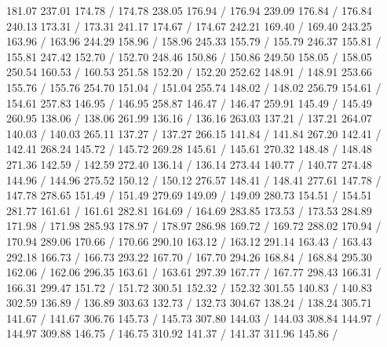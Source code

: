 { 181.07 237.01 174.78 /
 174.78 238.05 176.94 /
 176.94 239.09 176.84 /
 176.84 240.13 173.31 /
 173.31 241.17 174.67 /
 174.67 242.21 169.40 /
 169.40 243.25 163.96 /
 163.96 244.29 158.96 /
 158.96 245.33 155.79 /
 155.79 246.37 155.81 /
 155.81 247.42 152.70 /
 152.70 248.46 150.86 /
 150.86 249.50 158.05 /
 158.05 250.54 160.53 /
 160.53 251.58 152.20 /
 152.20 252.62 148.91 /
 148.91 253.66 155.76 /
 155.76 254.70 151.04 /
 151.04 255.74 148.02 /
 148.02 256.79 154.61 /
 154.61 257.83 146.95 /
 146.95 258.87 146.47 /
 146.47 259.91 145.49 /
 145.49 260.95 138.06 /
 138.06 261.99 136.16 /
 136.16 263.03 137.21 /
 137.21 264.07 140.03 /
 140.03 265.11 137.27 /
 137.27 266.15 141.84 /
 141.84 267.20 142.41 /
 142.41 268.24 145.72 /
 145.72 269.28 145.61 /
 145.61 270.32 148.48 /
 148.48 271.36 142.59 /
 142.59 272.40 136.14 /
 136.14 273.44 140.77 /
 140.77 274.48 144.96 /
 144.96 275.52 150.12 /
 150.12 276.57 148.41 /
 148.41 277.61 147.78 /
 147.78 278.65 151.49 /
 151.49 279.69 149.09 /
 149.09 280.73 154.51 /
 154.51 281.77 161.61 /
 161.61 282.81 164.69 /
 164.69 283.85 173.53 /
 173.53 284.89 171.98 /
 171.98 285.93 178.97 /
 178.97 286.98 169.72 /
 169.72 288.02 170.94 /
 170.94 289.06 170.66 /
 170.66 290.10 163.12 /
 163.12 291.14 163.43 /
 163.43 292.18 166.73 /
 166.73 293.22 167.70 /
 167.70 294.26 168.84 /
 168.84 295.30 162.06 /
 162.06 296.35 163.61 /
 163.61 297.39 167.77 /
 167.77 298.43 166.31 /
 166.31 299.47 151.72 /
 151.72 300.51 152.32 /
 152.32 301.55 140.83 /
 140.83 302.59 136.89 /
 136.89 303.63 132.73 /
 132.73 304.67 138.24 /
 138.24 305.71 141.67 /
 141.67 306.76 145.73 /
 145.73 307.80 144.03 /
 144.03 308.84 144.97 /
 144.97 309.88 146.75 /
 146.75 310.92 141.37 /
 141.37 311.96 145.86 /
}
